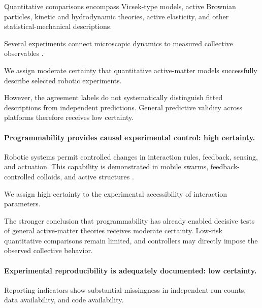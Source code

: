 Quantitative comparisons encompass
Vicsek-type models, active Brownian
particles, kinetic and hydrodynamic
theories, active elasticity, and
other statistical-mechanical
descriptions.

Several experiments connect
microscopic dynamics to measured
collective observables
\cite{Buerle2020formationofstable,Chvykov2020lowrattlingapred,Brandenbourger2021limitcyclesturnac,Xiao2023perceptionofmotion,Barone2024experimentalandnum,Heuthe2025tunablecolloidalsw,Boudet2025nonmarkoviandynami,Hanson2025electrokineticpropu,Zion2023morphologicalcomput}.

We assign moderate certainty
that quantitative active-matter
models successfully describe
selected robotic experiments.

However, the agreement labels
do not systematically distinguish
fitted descriptions from
independent predictions.
General predictive validity
across platforms therefore
receives low certainty.

\paragraph*{Programmability provides causal experimental control:
high certainty.}

Robotic systems permit controlled
changes in interaction rules,
feedback, sensing, and actuation.
This capability is demonstrated
in mobile swarms, feedback-controlled
colloids, and active structures
\cite{Ferrante2013aselfadaptivecomm,Li2019particleroboticsba,Buerle2020formationofstable,Chen2022collectiveresponse,Fruchart2022nonreciprocalphase,Heuthe2025tunablecolloidalsw,Brandenbourger2021limitcyclesturnac,Coulais2025activemetamaterials}.

We assign high certainty to
the experimental accessibility
of interaction parameters.

The stronger conclusion that
programmability has already
enabled decisive tests of
general active-matter theories
receives moderate certainty.
Low-risk quantitative comparisons
remain limited, and controllers
may directly impose the observed
collective behavior.

\paragraph*{Experimental reproducibility is adequately documented:
low certainty.}

Reporting indicators show
substantial missingness in
independent-run counts,
data availability, and
code availability.

